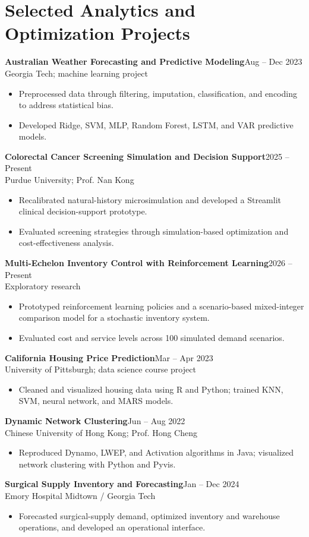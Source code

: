 \documentclass[letterpaper,10pt]{article}
\newcommand{\job}[3]{\textbf{#1}\hfill #2\\{\small #3}\par}
\begin{document}
\section{Selected Analytics and Optimization Projects}
\job{Australian Weather Forecasting and Predictive Modeling}{Aug -- Dec 2023}{Georgia Tech; machine learning project}
\begin{itemize}
\item Preprocessed data through filtering, imputation, classification, and encoding to address statistical bias.
\item Developed Ridge, SVM, MLP, Random Forest, LSTM, and VAR predictive models.
\end{itemize}
\job{Colorectal Cancer Screening Simulation and Decision Support}{2025 -- Present}{Purdue University; Prof. Nan Kong}
\begin{itemize}
\item Recalibrated natural-history microsimulation and developed a Streamlit clinical decision-support prototype.
\item Evaluated screening strategies through simulation-based optimization and cost-effectiveness analysis.
\end{itemize}
\job{Multi-Echelon Inventory Control with Reinforcement Learning}{2026 -- Present}{Exploratory research}
\begin{itemize}
\item Prototyped reinforcement learning policies and a scenario-based mixed-integer comparison model for a stochastic inventory system.
\item Evaluated cost and service levels across 100 simulated demand scenarios.
\end{itemize}
\job{California Housing Price Prediction}{Mar -- Apr 2023}{University of Pittsburgh; data science course project}
\begin{itemize}
\item Cleaned and visualized housing data using R and Python; trained KNN, SVM, neural network, and MARS models.
\end{itemize}
\job{Dynamic Network Clustering}{Jun -- Aug 2022}{Chinese University of Hong Kong; Prof. Hong Cheng}
\begin{itemize}
\item Reproduced Dynamo, LWEP, and Activation algorithms in Java; visualized network clustering with Python and Pyvis.
\end{itemize}
\job{Surgical Supply Inventory and Forecasting}{Jan -- Dec 2024}{Emory Hospital Midtown / Georgia Tech}
\begin{itemize}
\item Forecasted surgical-supply demand, optimized inventory and warehouse operations, and developed an operational interface.
\end{itemize}
\end{document}
